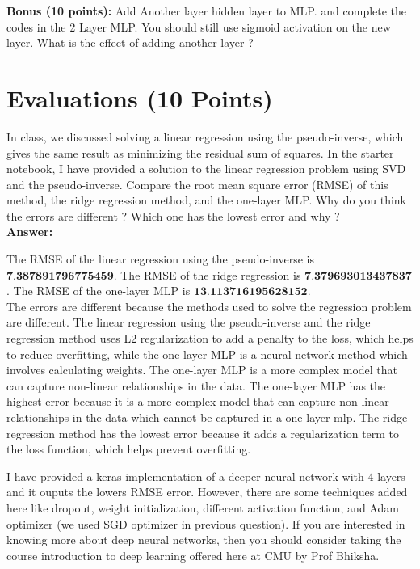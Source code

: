 \documentclass{article}
\begin{document}
\textbf{Bonus (10 points):} Add Another layer hidden layer to MLP. and complete the codes in the 2 Layer MLP.
You should still use sigmoid activation on the new layer. What is the effect of adding another layer ?

\section{Evaluations (10 Points)}
In class, we discussed solving a linear regression using the pseudo-inverse, which gives the same result as minimizing the residual sum of squares. In the starter notebook, I have provided a solution to the linear regression problem using SVD and the pseudo-inverse. Compare the root mean square error (RMSE) of this method, the ridge regression method, and the one-layer MLP. Why do you think the errors are different ?
Which one has the lowest error and why ?
\[\]
\textbf{Answer:}

The RMSE of the linear regression using the pseudo-inverse is \(\textbf{7.387891796775459}\).
The RMSE of the ridge regression is $\textbf{7.379693013437837}$.
The RMSE of the one-layer MLP is $\textbf{13.113716195628152}$.
\[
\]
The errors are different because the methods used to solve the regression problem are different. The linear regression using the pseudo-inverse and the ridge regression method uses L2 regularization to add a penalty to the loss, which helps to reduce overfitting, while the one-layer MLP is a neural network method which involves calculating weights. The one-layer MLP is a more complex model that can capture non-linear relationships in the data. The one-layer MLP has the highest error because it is a more complex model that can capture non-linear relationships in the data which cannot be captured in a one-layer mlp. The ridge regression method has the lowest error because it adds a regularization term to the loss function, which helps prevent overfitting.
\[
\]


I have provided a keras implementation of a deeper neural network with 4 layers and it ouputs the lowers
RMSE error. However, there are some techniques added here like dropout, weight initialization, different
activation function, and Adam optimizer (we used SGD optimizer in previous question). If you are interested
in knowing more about deep neural networks, then you should consider taking the course introduction to
deep learning offered here at CMU by Prof Bhiksha.
\end{document}
